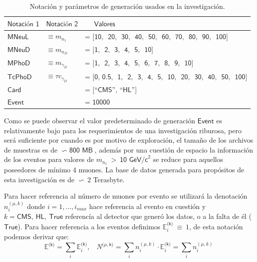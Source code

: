 \begin{table}[!ht]
\centering
\begin{tabular}{|lll|}
\hline
$\textsf{Notación 1}$  & $\textsf{Notación 2}$  & $\textsf{~~~~Valores}$\\
\hline
$\textsf{MNeuL}$    & $\equiv m_{n_1}$  & $\textsf{= [10, ~20, ~30, ~40, ~50, ~60, ~70, ~80, ~90, ~100]}$\\
$\textsf{MNeuD}$    & $\equiv m_{n_D}$  & $\textsf{= [1, ~2, ~3, ~4, ~5, ~10]}$\\
$\textsf{MPhoD}$    & $\equiv m_{\gamma_D}$  & $\textsf{= [1, ~2, ~3, ~4, ~5, ~6, ~7, ~8, ~9, ~10]}$\\
$\textsf{TcPhoD}$   & $\equiv \tau c_{\gamma_D}$  & $\textsf{= [0,~0.5, ~1, ~2, ~3, ~4, ~5, ~10, ~20, ~30, ~40, ~50, ~100]}$\\
$\textsf{Card}$     & & $\textsf{= [``CMS'', ``HL'']}$ \\
$\textsf{Event}$    & & $\textsf{= 10000}$ \\
\hline
\end{tabular}%
\caption{Notación y parámetros de generación usados en la investigación.}
\label{parametros_generacion}
\end{table}

Como se puede observar el valor predeterminado de generación $\textsf{Event}$ es relativamente bajo para los requerimientos de una investigación riburosa, pero será suficiente por cuando es por motivo de exploración, el tamaño de los archivos de muestras es de $\backsim\textsf{ 800 MB}$, además por una cuestión de espacio la información de los eventos para valores de $m_{n_1}~>~\textsf{10 GeV/c}^2$ %
se reduce para aquellos poseedores de mínimo 4 muones. La base de datos generada para propósitos de esta investigación es de $\backsim ~2$ Terasbyte.

Para hacer referencia al número de muones por evento se utilizará la denotación $n_i^{(\mu,k)}$ donde $i = 1, \ldots, i_{max}$ hace referencia al evento en cuestión y $k = \textsf{CMS},~\textsf{HL}, ~\textsf{True}$ referencía al detector que generó los datos, o a la falta de él ($\textsf{True}$). Para hacer referencia a los eventos definimos $\mathbb{E}_i^\textsf{(k)} ~ \equiv ~1$, de esta notación podemos derivar que:
\begin{equation}\label{notaEvent}
\mathbb{E}^\textsf{(k)} = \sum_i \mathbb{E}_i^\textsf{(k)} , ~~~~ N^{(\mu,\textsf{k)}} = \sum_i n_i^{(\mu,k)} \cdot \mathbb{E}_i^{(\textsf{k)}} = \sum_i n_i^{(\mu,k)}
\end{equation}

